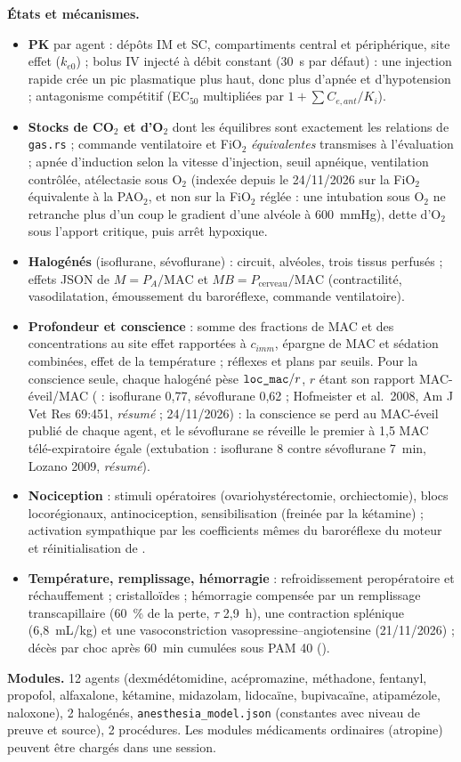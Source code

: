 \documentclass[10pt,a4paper]{article}
\newcommand{\cmd}[1]{\texttt{#1}}
\newcommand{\vp}[1]{\text{\texttt{\detokenize{#1}}}}
\newcommand{\acc}[1]{\textsl{#1}}
\begin{document}
\textbf{États et mécanismes.}
\begin{itemize}
\item \textbf{PK} par agent : dépôts IM et SC, compartiments central et périphérique, site effet ($k_{e0}$) ; bolus IV injecté à débit constant (30~s par défaut) : une injection rapide crée un pic plasmatique plus haut, donc plus d'apnée et d'hypotension ; antagonisme compétitif (EC$_{50}$ multipliées par $1 + \sum C_{e,ant}/K_i$).
\item \textbf{Stocks de CO$_2$ et d'O$_2$} dont les équilibres sont exactement les relations de \cmd{gas.rs} ; commande ventilatoire et FiO$_2$ \emph{équivalentes} transmises à l'évaluation ; apnée d'induction selon la vitesse d'injection, seuil apnéique, ventilation contrôlée, atélectasie sous O$_2$ (indexée depuis le 24/11/2026 sur la FiO$_2$ équivalente à la PAO$_2$, et non sur la FiO$_2$ réglée : une intubation sous O$_2$ ne retranche plus d'un coup le gradient d'une alvéole à 600~mmHg), dette d'O$_2$ sous l'apport critique, puis arrêt hypoxique.
\item \textbf{Halogénés} (isoflurane, sévoflurane) : circuit, alvéoles, trois tissus perfusés ; effets JSON de $M = P_A/\text{MAC}$ et $MB = P_\text{cerveau}/\text{MAC}$ (contractilité, vasodilatation, émoussement du baroréflexe, commande ventilatoire).
\item \textbf{Profondeur et conscience} : somme des fractions de MAC et des concentrations au site effet rapportées à $c_{imm}$, épargne de MAC et sédation combinées, effet de la température ; réflexes et plans par seuils. Pour la conscience seule, chaque halogéné pèse $\vp{loc_mac}/r$, $r$ étant son rapport MAC-éveil/MAC (\vp{mac_awake_ratio} : isoflurane 0,77, sévoflurane 0,62 ; Hofmeister et al.\ 2008, Am J Vet Res 69:451, \acc{résumé} ; 24/11/2026) : la conscience se perd au MAC-éveil publié de chaque agent, et le sévoflurane se réveille le premier à 1,5 MAC télé-expiratoire égale (extubation : isoflurane 8 contre sévoflurane 7~min, Lozano 2009, \acc{résumé}).
\item \textbf{Nociception} : stimuli opératoires (ovariohystérectomie, orchiectomie), blocs locorégionaux, antinociception, sensibilisation (freinée par la kétamine) ; activation sympathique par les coefficients mêmes du baroréflexe du moteur et réinitialisation de \vp{map_set}.
\item \textbf{Température, remplissage, hémorragie} : refroidissement peropératoire et réchauffement ; cristalloïdes ; hémorragie compensée par un remplissage transcapillaire (60~\% de la perte, $\tau$ 2,9~h), une contraction splénique (6,8~mL/kg) et une vasoconstriction vasopressine--angiotensine (21/11/2026) ; décès par choc après 60~min cumulées sous PAM 40 (\vp{shock_tol_min}).
\end{itemize}
\textbf{Modules.} 12 agents (dexmédétomidine, acépromazine, méthadone, fentanyl, propofol, alfaxalone, kétamine, midazolam, lidocaïne, bupivacaïne, atipamézole, naloxone), 2 halogénés, \cmd{anesthesia\_model.json} (constantes avec niveau de preuve et source), 2 procédures. Les modules médicaments ordinaires (atropine) peuvent être chargés dans une session.
\end{document}
